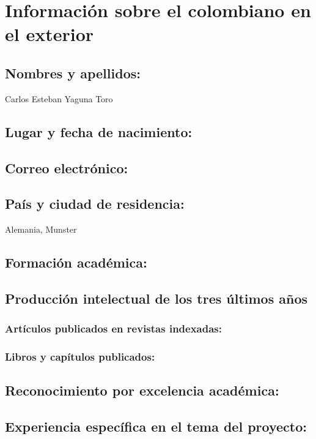 \section{Información sobre el colombiano en el exterior}
\subsection{Nombres y apellidos: }
Carlos Esteban Yaguna Toro
\subsection{Lugar y fecha de nacimiento: }
\fnyaguna
\subsection{Correo electrónico: }
\emyaguna
\subsection{País y ciudad de residencia: }
Alemania, M\:unster
\subsection{Formación académica:}
\subsection{Producción intelectual de los tres últimos años}
\subsubsection{Artículos publicados en revistas indexadas:}
\subsubsection{Libros y capítulos publicados:}
\subsection{Reconocimiento por excelencia académica:}
\subsection{Experiencia específica en el tema del proyecto:}
